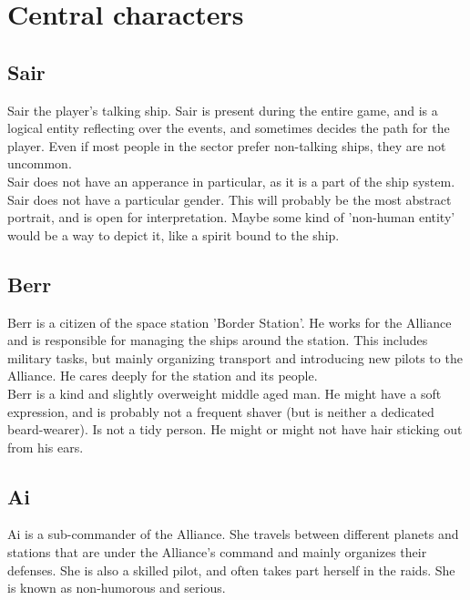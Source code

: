\documentclass[a4paper,12pt]{article}
\begin{document}
\section{Central characters}

\subsection{Sair}

Sair the player's talking ship. Sair is present during the entire game, and is a logical entity
reflecting over the events, and sometimes decides the path for the player.
Even if most people in the sector prefer non-talking ships, they are not uncommon.\\

Sair does not have an apperance in particular, as it is a part of the ship system. Sair does
not have a particular gender. This will probably be the most abstract portrait, and is open for
interpretation. Maybe some kind of 'non-human entity' would be a way to depict it, like a spirit
bound to the ship.

\subsection{Berr}

Berr is a citizen of the space station 'Border Station'. He works for the Alliance and is responsible for
managing the ships around the station. This includes military tasks, but mainly organizing transport
and introducing new pilots to the Alliance. He cares deeply for the station and its people.\\

Berr is a kind and slightly overweight middle aged man. He might have a soft expression, and is probably
not a frequent shaver (but is neither a dedicated beard-wearer). Is not a tidy person. He might or might not
have hair sticking out from his ears.

\subsection{Ai}

Ai is a sub-commander of the Alliance. She travels between different planets and stations that are
under the Alliance's command and mainly organizes their defenses. She is also a skilled pilot, and often
takes part herself in the raids. She is known as non-humorous and serious.\\
\end{document}
